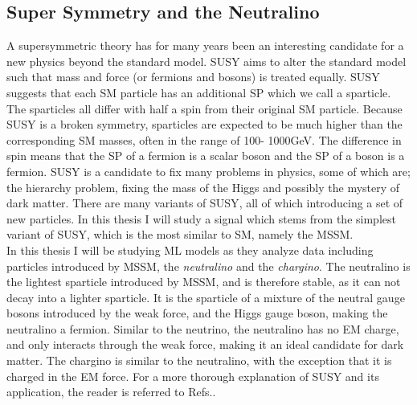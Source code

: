 \subsection{Super Symmetry and the Neutralino}\label{subsec:SS}
A supersymmetric theory has for many years been an interesting candidate for a new physics beyond the standard 
model. \ac{SUSY} aims to alter the standard model such that mass and force (or fermions and bosons) is treated equally. 
\ac{SUSY} suggests that each \ac{SM} particle has an additional \ac{SP} which we call a sparticle. 
The sparticles all differ with half a spin from their original \ac{SM} particle. Because \ac{SUSY} is a broken symmetry, 
sparticles are expected to be much higher than the corresponding \ac{SM} masses, often in the range of 100- 1000GeV. 
The difference in spin means that the \ac{SP} of a fermion is a scalar boson and the \ac{SP} of a boson is a fermion. \ac{SUSY} is a 
candidate to fix many problems in physics, some of which are; the hierarchy problem, fixing the mass of the Higgs 
and possibly the mystery of dark matter. There are many variants of \ac{SUSY}, all of which introducing a set of new 
particles. In this thesis I will study a signal which stems from the simplest variant of \ac{SUSY}, which is the most 
similar to \ac{SM}, namely the \ac{MSSM}. 
\\
In this thesis I will be studying \ac{ML} models as they analyze data including particles introduced by \ac{MSSM}, the \emph{neutralino} and 
the \emph{chargino}. The neutralino is the lightest sparticle introduced by \ac{MSSM}, and is therefore stable, as it can not decay into a lighter sparticle. 
It is the sparticle of a mixture of the neutral gauge bosons introduced by the weak force, and the Higgs gauge boson, making the neutralino a 
fermion. Similar to the neutrino, the neutralino has no \ac{EM} charge, and only interacts through the weak force, making it an ideal candidate 
for dark matter. The chargino is similar to the neutralino, with the exception that it is charged in the \ac{EM} force. 
For a more thorough explanation of \ac{SUSY} and its application, the reader is referred to Refs.\cite{SUSY}. 